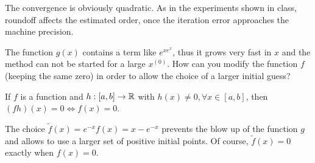 \begin{problem}
\begin{subproblem}[2]
\begin{solution}
The convergence is obviously quadratic. As in the experiments shown in class,
roundoff affects the estimated order, once the iteration error approaches the
machine precision. 
\end{solution}
\end{subproblem}

\begin{subproblem}[2]
The function $g(x)$ contains a term like $e^{xe^x}$, thus it grows very fast in $x$ and the method can not be started for a large $x^{(0)}$.
How can you modify the function $f$ (keeping the same zero) in order to allow the choice of a larger initial guess?

\begin{hint}
 If $f$ is a function and $h: [a,b] \rightarrow \mathbb{R}$ with $h(x) \neq 0, \forall x \in [a,b]$, then $(fh)(x) = 0 \Leftrightarrow f(x) = 0$.
\end{hint}


\cprotEnv \begin{solution}
The choice $\tilde f(x) = e^{-x}f(x)= x-e^{-x}$ prevents the blow up of the function $g$ and allows to use a larger set of positive initial points.
Of course, $\tilde f(x)=0$ exactly when $f(x)=0$.

\end{solution}
\end{subproblem}
\end{problem}

